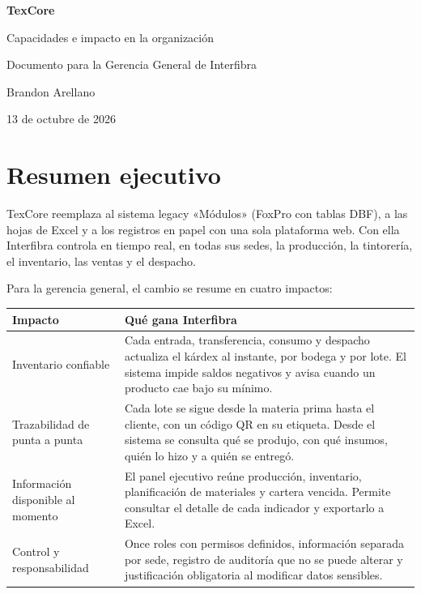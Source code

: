 \documentclass[11pt,a4paper]{article}
\newcommand{\encabezado}{\rowcolor{fondo}}
\begin{document}
\begin{titlepage}
  \centering
  \vspace*{3.5cm}
  {\Huge\bfseries TexCore\par}
  \vspace{0.6cm}
  {\LARGE Capacidades e impacto en la organización\par}
  \vspace{1.2cm}
  {\large Documento para la Gerencia General de Interfibra\par}
  \vfill
  {\large Brandon Arellano\par}
  \vspace{0.3cm}
  {\large 13 de octubre de 2026\par}
  \vspace{2cm}
\end{titlepage}

\tableofcontents
\newpage

\section{Resumen ejecutivo}

TexCore reemplaza al sistema legacy «Módulos» (FoxPro con tablas DBF), a las hojas de Excel y a los registros en papel con una sola plataforma web. Con ella Interfibra controla en tiempo real, en todas sus sedes, la producción, la tintorería, el inventario, las ventas y el despacho.

Para la gerencia general, el cambio se resume en cuatro impactos:

\begin{center}
\begin{tabularx}{\textwidth}{P{4.2cm}L}
\toprule
\encabezado \textbf{Impacto} & \textbf{Qué gana Interfibra} \\
\midrule
Inventario confiable & Cada entrada, transferencia, consumo y despacho actualiza el kárdex al instante, por bodega y por lote. El sistema impide saldos negativos y avisa cuando un producto cae bajo su mínimo. \\
Trazabilidad de punta a punta & Cada lote se sigue desde la materia prima hasta el cliente, con un código QR en su etiqueta. Desde el sistema se consulta qué se produjo, con qué insumos, quién lo hizo y a quién se entregó. \\
Información disponible al momento & El panel ejecutivo reúne producción, inventario, planificación de materiales y cartera vencida. Permite consultar el detalle de cada indicador y exportarlo a Excel. \\
Control y responsabilidad & Once roles con permisos definidos, información separada por sede, registro de auditoría que no se puede alterar y justificación obligatoria al modificar datos sensibles. \\
\bottomrule
\end{tabularx}
\end{center}
\end{document}
